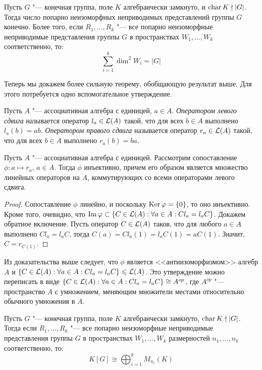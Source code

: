 \begin{corollary}
	Пусть $G$ "--- конечная группа, поле $K$ алгебраически замкнуто, и $\operatorname{char}{K} \nmid |G|$. Тогда число попарно неизоморфных неприводимых представлений группы $G$ конечно. Более того, если $R_1, \dotsc, R_k$ "--- все попарно неизоморфные неприводимые представления группы $G$ в пространствах $W_1, \dotsc, W_k$ соответственно, то:
	\[\sum_{i = 1}^k\dim^2{W_i} = |G|\]
\end{corollary}

Теперь мы докажем более сильную теорему, обобщающую результат выше. Для этого потребуется одно вспомогательное утверждение.

\begin{definition}
	Пусть $A$ "--- ассоциативная алгебра с единицей, $a \in A$. \textit{Оператором левого сдвига} называется оператор $l_a \in \mathcal L(A)$ такой, что для всех $b \in A$ выполнено $l_a(b) = ab$. \textit{Оператором правого сдвига} называется оператор $r_a \in \mathcal L(A)$ такой, что для всех $b \in A$ выполнено $r_a(b) = ba$.
\end{definition}

\begin{proposition}
	Пусть $A$ "--- ассоциативная алгебра с единицей. Рассмотрим сопоставление $\phi: a \mapsto r_a$, $a \in A$. Тогда $\phi$ инъективно, причем его образом является множество линейных операторов на $A$, коммутирующих со всеми операторами левого сдвига.
\end{proposition}

\begin{proof}
	Сопоставление $\phi$ линейно, и поскольку $\operatorname{Ker}\varphi = \{0\}$, то оно инъективно. Кроме того, очевидно, что $\operatorname{Im}\varphi \subset \{C\in \mathcal L(A): \forall a \in A: Cl_a = l_aC\}$. Докажем обратное включение. Пусть оператор $C \in \mathcal L(A)$ таков, что для любого $a \in A$ выполнено $Cl_a = l_aC$, тогда $C(a) = Cl_a(1) = l_aC(1) = aC(1)$. Значит, $C = r_{C(1)}$.
\end{proof}

\begin{note}
	Из доказательства выше следует, что $\phi$ является <<антиизоморфизмом>> алгебр $A$ и $\{C\in \mathcal L(A): \forall a \in A: Cl_a = l_aC\} \leqslant \mathcal L(A)$. Это утверждение можно переписать в виде $\{C\in \mathcal L(A): \forall a \in A: Cl_a = l_aC\} \cong A^{op}$, где $A^{op}$ "--- пространство $A$ с умножением, меняющим множители местами относительно обычного умножения в $A$.
\end{note}

\begin{theorem}
	Пусть $G$ "--- конечная группа, поле $K$ алгебраически замкнуто, $\operatorname{char}{K} \nmid |G|$. Тогда если $R_1, \dotsc, R_k$ "--- все попарно неизоморфные неприводимые представления группы $G$ в пространствах $W_1, \dotsc, W_k$ размерностей $n_1, \dotsc, n_k$ соответственно, то:
	\[K[G] \cong \bigoplus_{i=1}^kM_{n_i}(K)\]
\end{theorem}

